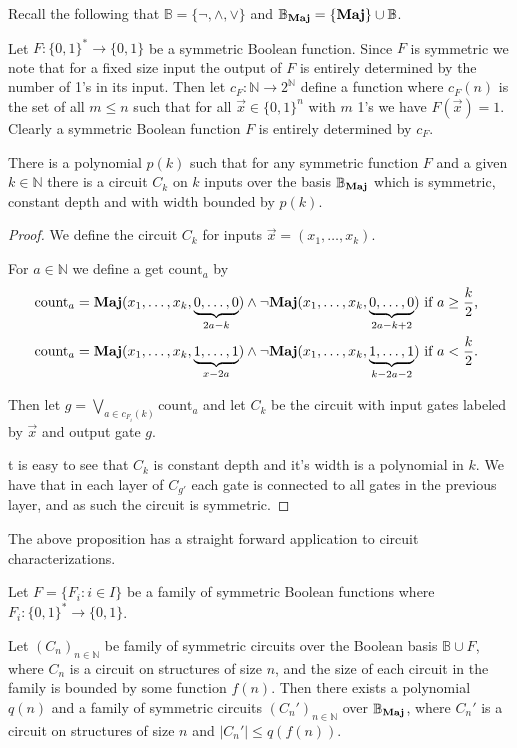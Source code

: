 \documentclass[12pt]{report}
\newcommand{\maj}{\text{\textbf{Maj}}}
\newcommand{\countgate}{\text{count}}
\begin{document}
Recall the following that $\mathbb{B} = \{ \neg , \wedge , \lor \}$ and
$\mathbb{B}_\maj = \{ \maj \} \cup \mathbb{B}$.

Let $F: \{0,1\}^* \rightarrow \{0,1\}$ be a symmetric Boolean function. Since
$F$ is symmetric we note that for a fixed size input the output of $F$ is
entirely determined by the number of 1's in its input. Then let
$c_{F}:\mathbb{N} \rightarrow 2^{\mathbb{N}}$ define a function where $c_{F}(n)$
is the set of all $m \leq n$ such that for all $\vec{x} \in \{ 0,1 \}^n$ with
$m$ 1's we have $F (\vec{x}) = 1$. Clearly a symmetric Boolean function $F$ is
entirely determined by $c_{F}$.
 
\begin{prop}
  \label{prop:fuctions-maj}
  There is a polynomial $p(k)$ such that for any symmetric function $F$ and a
  given $k \in \mathbb{N}$ there is a circuit $C_k$ on $k$ inputs over the basis
  $\mathbb{B}_\maj$ which is symmetric, constant depth and with width bounded by
  $p(k)$.
\end{prop}

\begin{proof}
  We define the circuit $C_k$ for inputs $\vec{x} = ( x_1, \ldots, x_k )$.

  For $a \in \mathbb{N}$ we define a get $\countgate_a$ by
  \begin{align*}
    &\countgate_a = \maj (x_1, \ldots, x_k, \underbrace {0, \ldots, 0}_{2a -
      k}) \land \neg \maj (x_1, \ldots , x_k, \underbrace{0, \ldots,  0}_{2a - k + 2})\text{ if $a \geq \frac{k}{2}$,} \\
    &\countgate_a = \maj (x_1, \ldots, x_k, \underbrace {1, \ldots, 1}_{x -
      2a}) \land \neg \maj (x_1, \ldots , x_k, \underbrace{1, \ldots,
      1}_{k - 2a -2}) \text{ if $a < \frac{k}{2}$. }
  \end{align*}

  Then let $g = \bigvee_{a \in c_{F_i}(k)}\countgate_a$ and let $C_{k}$ be the
  circuit with input gates labeled by $\vec{x}$ and output gate $g$.

  t is easy to see that $C_k$ is constant depth and it's width is a polynomial
  in $k$. We have that in each layer of $C_{g'}$ each gate is connected to all
  gates in the previous layer, and as such the circuit is symmetric.
\end{proof}

The above proposition has a straight forward application to circuit
characterizations.

\begin{prop}
  Let $F = \{F_i : i \in I \}$ be a family of symmetric Boolean functions where
  $F_i: \{0,1\}^* \rightarrow \{ 0,1 \}$.

  Let $(C_n)_{n \in \mathbb{N}}$ be family of symmetric circuits over the
  Boolean basis $\mathbb{B} \cup F$, where $C_n$ is a circuit on structures of
  size $n$, and the size of each circuit in the family is bounded by some
  function $f(n)$. Then there exists a polynomial $q(n)$ and a family of
  symmetric circuits $(C_n')_{n \in \mathbb{N}}$ over $\mathbb{B}_\maj$, where
  $C_n'$ is a circuit on structures of size $n$ and $\vert C_n' \vert \leq
  q(f(n))$.
\end{prop}
\end{document}
